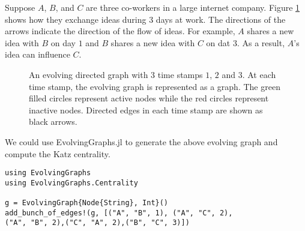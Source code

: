 \documentclass[12pt]{article}
\theoremstyle{definition}
\begin{document}
Suppose $A$, $B$, and $C$ are three co-workers in a large internet company. Figure \ref{fig:katz_eg}
shows how they exchange ideas during $3$ days at work. The directions of the arrows indicate the direction of the flow of ideas.
For example, $A$ shares a new idea with $B$ on day $1$ and $B$ shares a new idea with $C$ on dat $3$. As a result, $A$'s idea can influence $C$.

\begin{figure}[h]
 \begin{center}
\end{center}
\caption{An evolving directed graph with 3 time stamps $1$, $2$ and $3$.
At each time stamp, the evolving graph is represented as a graph.
The green filled circles represent active nodes while the red circles represent
inactive nodes. Directed edges in each time stamp are shown as black arrows.}
\label{fig:katz_eg}
\end{figure}

We could use EvolvingGraphs.jl to generate the above evolving graph and compute the Katz centrality.

\begin{lstlisting}
using EvolvingGraphs
using EvolvingGraphs.Centrality

g = EvolvingGraph{Node{String}, Int}()
add_bunch_of_edges!(g, [("A", "B", 1), ("A", "C", 2),
("A", "B", 2),("C", "A", 2),("B", "C", 3)])
\end{lstlisting}
\end{document}
